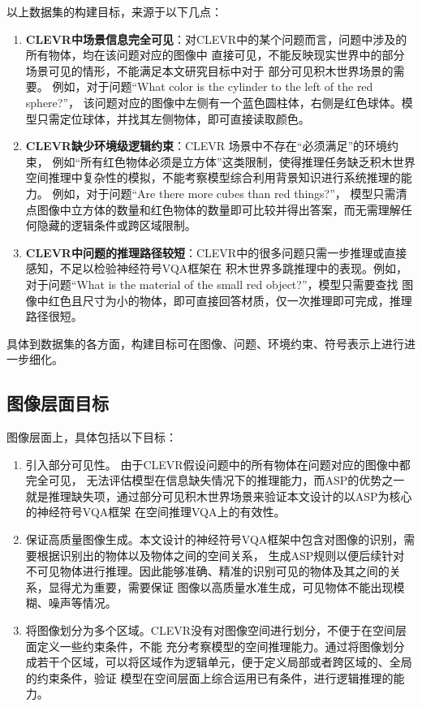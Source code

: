 以上数据集的构建目标，来源于以下几点：
\begin{enumerate}[nosep]
\item \textbf{CLEVR中场景信息完全可见}：对CLEVR中的某个问题而言，问题中涉及的所有物体，均在该问题对应的图像中
直接可见，不能反映现实世界中的部分场景可见的情形，不能满足本文研究目标中对于
部分可见积木世界场景的需要。
例如，对于问题“What color is the cylinder to the left of the red sphere?”，
该问题对应的图像中左侧有一个蓝色圆柱体，右侧是红色球体。模型只需定位球体，并找其左侧物体，即可直接读取颜色。
\item \textbf{CLEVR缺少环境级逻辑约束}：CLEVR 场景中不存在“必须满足”的环境约束，
例如“所有红色物体必须是立方体”这类限制，使得推理任务缺乏积木世界空间推理中复杂性的模拟，不能考察模型综合利用背景知识进行系统推理的能力。
例如，对于问题“Are there more cubes than red things?”，
模型只需清点图像中立方体的数量和红色物体的数量即可比较并得出答案，而无需理解任何隐藏的逻辑条件或跨区域限制。
\item \textbf{CLEVR中问题的推理路径较短}：CLEVR中的很多问题只需一步推理或直接感知，不足以检验神经符号VQA框架在
积木世界多跳推理中的表现。例如，对于问题“What is the material of the small red object?”，模型只需要查找
图像中红色且尺寸为小的物体，即可直接回答材质，仅一次推理即可完成，推理路径很短。
\end{enumerate}
具体到数据集的各方面，构建目标可在图像、问题、环境约束、符号表示上进行进一步细化。
\subsection{图像层面目标}
图像层面上，具体包括以下目标：
\begin{enumerate}[nosep]
\item 引入部分可见性。
由于CLEVR假设问题中的所有物体在问题对应的图像中都完全可见，
无法评估模型在信息缺失情况下的推理能力，而ASP的优势之一就是推理缺失项\cite{fandinno2021planningincompleteinformationquantified}，通过部分可见积木世界场景来验证本文设计的以ASP为核心的神经符号VQA框架
在空间推理VQA上的有效性。
\item 保证高质量图像生成。本文设计的神经符号VQA框架中包含对图像的识别，需要根据识别出的物体以及物体之间的空间关系，
生成ASP规则以便后续针对不可见物体进行推理。因此能够准确、精准的识别可见的物体及其之间的关系，显得尤为重要，需要保证
图像以高质量水准生成，可见物体不能出现模糊、噪声等情况。
\item 将图像划分为多个区域。CLEVR没有对图像空间进行划分，不便于在空间层面定义一些约束条件，不能
充分考察模型的空间推理能力。通过将图像划分成若干个区域，可以将区域作为逻辑单元，便于定义局部或者跨区域的、全局的约束条件，验证
模型在空间层面上综合运用已有条件，进行逻辑推理的能力。
\end{enumerate}
